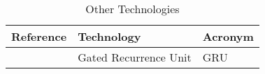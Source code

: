 \documentclass[11pt,a4paper]{article}
\begin{document}
\begin{table}[h!]
\centering
\caption{Other Technologies}
\begin{tabular}{|P{2cm}|p{8cm}|P{2cm}|  }
 \hline
 \textbf{Reference} & \textbf{Technology} & \textbf{Acronym} \\
 \hline
\cite{choLearningPhraseRepresentations2014} & Gated Recurrence Unit & GRU \\ \hline

\end{tabular}
\end{table}



\nocite{*}  %



\end{document}
